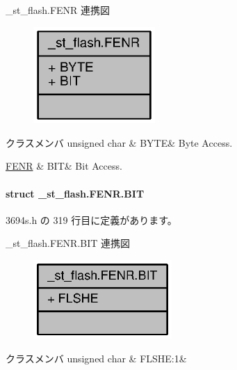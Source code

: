 \+\_\+st\+\_\+flash.\+F\+E\+N\+R 連携図
\nopagebreak
\begin{figure}[H]
\begin{center}
\leavevmode
\includegraphics[width=131pt]{db/ddc/union__st__flash_8FENR__coll__graph}
\end{center}
\end{figure}
\begin{DoxyFields}{クラスメンバ}
unsigned char\label{3694s_8h_ae409eb2ba6eb6801f52763ae370c350e}
&
B\+Y\+T\+E&
Byte Access. \\
\hline

\hyperlink{3694s_8h_d0/da3/struct__st__flash_8FENR_8BIT}{F\+E\+N\+R}\label{3694s_8h_adb957fdc8000e1eef04a243f5199aa52}
&
B\+I\+T&
Bit Access. \\
\hline

\end{DoxyFields}
\label{struct__st__flash_8FENR_8BIT}
\paragraph{struct \+\_\+st\+\_\+flash.\+F\+E\+N\+R.\+B\+I\+T}


 3694s.\+h の 319 行目に定義があります。



\+\_\+st\+\_\+flash.\+F\+E\+N\+R.\+B\+I\+T 連携図
\nopagebreak
\begin{figure}[H]
\begin{center}
\leavevmode
\includegraphics[width=149pt]{d2/da3/struct__st__flash_8FENR_8BIT__coll__graph}
\end{center}
\end{figure}
\begin{DoxyFields}{クラスメンバ}
unsigned char\label{3694s_8h_ab416e3def56288bf1c9127e5fbf5e6df}
&
F\+L\+S\+H\+E\+:1&
\\
\hline

\end{DoxyFields}
\label{union__st__tv_8TCRV0}
